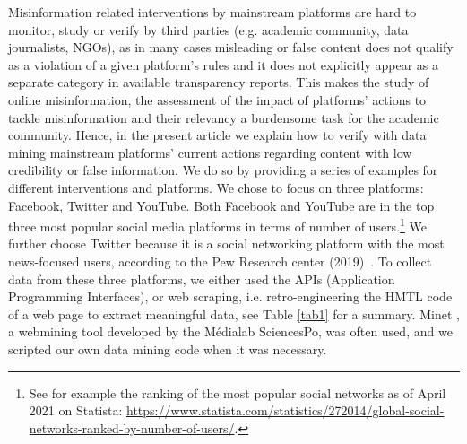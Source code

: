 \documentclass{article}
\begin{document}
Misinformation related interventions by mainstream platforms are hard to monitor, study or verify by third parties (e.g. academic community, data journalists, NGOs), as in many cases misleading or false content does not qualify as a violation of a given platform's rules and it does not explicitly appear as a separate category in available transparency reports. This makes the study of online misinformation, the assessment of the impact of platforms' actions to tackle misinformation and their relevancy a burdensome task for the academic community. Hence, in the present article we explain how to verify with data mining mainstream platforms' current actions regarding content with low credibility or false information. We do so by providing a series of examples for different interventions and platforms. We chose to focus on three platforms: Facebook, Twitter and YouTube. Both Facebook and YouTube are in the top three most popular social media platforms in terms of number of users.\footnote{See for example the ranking of the most popular social networks as of April 2021 on Statista: \href{https://www.statista.com/statistics/272014/global-social-networks-ranked-by-number-of-users/}{https://www.statista.com/statistics/272014/global-social-networks-ranked-by-number-of-users/}.} We further choose Twitter because it is a social networking platform with the most news-focused users, according to the Pew Research center (2019)~\cite{pew1}. To collect data from these three platforms, we either used the APIs (Application Programming Interfaces), or web scraping, i.e. retro-engineering the HMTL code of a web page to extract meaningful data, see Table \ref{tab1} for a summary. Minet \cite{minet}, a webmining tool developed by the Médialab SciencesPo, was often used, and we scripted our own data mining code when it was necessary.
\end{document}
